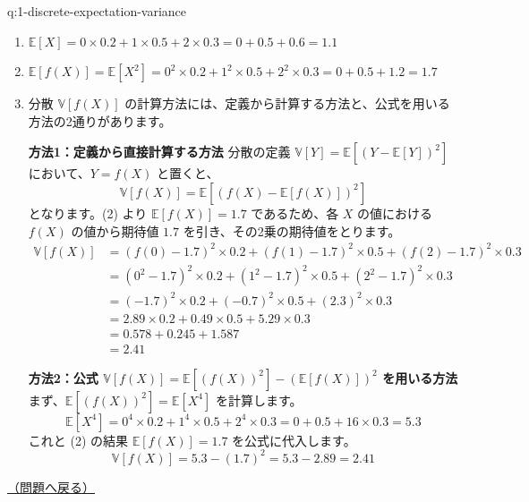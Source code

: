 \documentclass[
  pandoc]{bxjsarticle}
\begin{document}
\begin{answerbox}[phantomlabel=a:1-discrete-expectation-variance]{q:1-discrete-expectation-variance}

\begin{enumerate}
\def\labelenumi{\arabic{enumi}.}
\item
  \(\mathbb{E}[X] = 0 \times 0.2 + 1 \times 0.5 + 2 \times 0.3 = 0 + 0.5 + 0.6 = 1.1\)
\item
  \(\mathbb{E}[f(X)] = \mathbb{E}[X^2] = 0^2 \times 0.2 + 1^2 \times 0.5 + 2^2 \times 0.3 = 0 + 0.5 + 1.2 = 1.7\)
\item
  分散 \(\mathbb{V}[f(X)]\)
  の計算方法には、定義から計算する方法と、公式を用いる方法の2通りがあります。

  \textbf{方法1：定義から直接計算する方法} 分散の定義
  \(\mathbb{V}[Y] = \mathbb{E}[(Y - \mathbb{E}[Y])^2]\)
  において、\(Y = f(X)\) と置くと、 \[
   \mathbb{V}[f(X)] = \mathbb{E}\left[ (f(X) - \mathbb{E}[f(X)])^2 \right]
   \] となります。(2) より \(\mathbb{E}[f(X)] = 1.7\) であるため、各
  \(X\) の値における \(f(X)\) の値から期待値 \(1.7\)
  を引き、その2乗の期待値をとります。 \begin{align*}
   \mathbb{V}[f(X)] &= (f(0) - 1.7)^2 \times 0.2 + (f(1) - 1.7)^2 \times 0.5 + (f(2) - 1.7)^2 \times 0.3 \\
   &= (0^2 - 1.7)^2 \times 0.2 + (1^2 - 1.7)^2 \times 0.5 + (2^2 - 1.7)^2 \times 0.3 \\
   &= (-1.7)^2 \times 0.2 + (-0.7)^2 \times 0.5 + (2.3)^2 \times 0.3 \\
   &= 2.89 \times 0.2 + 0.49 \times 0.5 + 5.29 \times 0.3 \\
   &= 0.578 + 0.245 + 1.587 \\
   &= 2.41
   \end{align*}

  \textbf{方法2：公式
  \(\mathbb{V}[f(X)] = \mathbb{E}[(f(X))^2] - (\mathbb{E}[f(X)])^2\)
  を用いる方法} まず、\(\mathbb{E}[(f(X))^2] = \mathbb{E}[X^4]\)
  を計算します。 \[
   \mathbb{E}[X^4] = 0^4 \times 0.2 + 1^4 \times 0.5 + 2^4 \times 0.3 = 0 + 0.5 + 16 \times 0.3 = 5.3
   \] これと (2) の結果 \(\mathbb{E}[f(X)] = 1.7\) を公式に代入します。
  \[
   \mathbb{V}[f(X)] = 5.3 - (1.7)^2 = 5.3 - 2.89 = 2.41
   \]
\end{enumerate}

\hfill 

\hyperref[q:1-discrete-expectation-variance]{（問題へ戻る）}

\end{answerbox}
\end{document}
